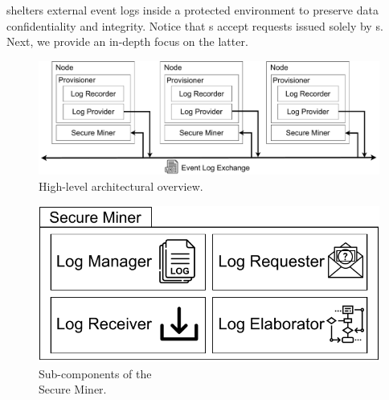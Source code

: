 shelters external event logs inside a protected environment to preserve data confidentiality and integrity.
Notice that s accept requests issued solely by s. 
Next, we provide an in-depth focus on the latter.

\begin{figure}[t]
	\centering
	\includegraphics[width=0.79\linewidth]{content/figures/architecturediagram.pdf}
	\caption{High-level architectural overview.}
	\label{fig:architecture_diagram}
\end{figure}

\begin{figure}
	\vspace{-2em}
	\centering
	\includegraphics[width=1\textwidth]{content/figures/secureminersad.pdf}
	\caption[A gull]{Sub-components of the \\Secure Miner.}
	\label{fig:trusted_miner}
	\vspace{-6pt}
\end{figure} 
